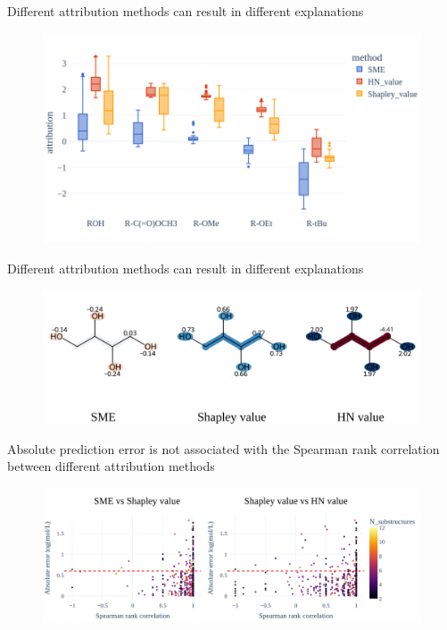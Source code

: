 \documentclass[aspectratio=169]{beamer}
\begin{document}
\begin{frame}{Different attribution methods can result in different explanations}

    \begin{figure}[h]
        \centering
        \includegraphics[scale=0.40]{../thesis/Fig/attribution_distribution_functional_groups.png}
    \end{figure}
  
\end{frame}


\begin{frame}{Different attribution methods can result in different explanations}

    \begin{figure}[h]
        \centering
        \includegraphics[scale=0.70]{../thesis/Fig/erythritol_explanations_2.png}
    \end{figure}
  
\end{frame}


\begin{frame}{Absolute prediction error is not associated with the Spearman rank correlation between different attribution methods}

    \begin{figure}[h]
        \centering
        \includegraphics[scale=0.70]{../thesis/Fig/rmse_vs_rank_corr_attributions.png}
    \end{figure}
   
\end{frame}
\end{document}
